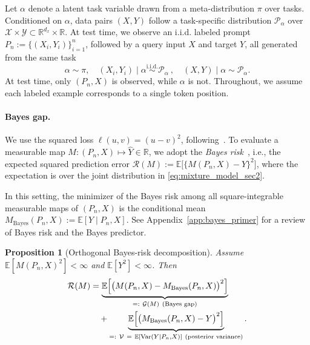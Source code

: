 \documentclass{article}
\theoremstyle{plain}
\newtheorem{proposition}[theorem]{Proposition}
\theoremstyle{definition}
\theoremstyle{remark}
\begin{document}
Let $\alpha$ denote a latent task variable drawn from a meta-distribution $\pi$ over tasks. Conditioned on $\alpha$, data pairs $(X,Y)$ follow a task-specific distribution $\mathcal{P}_\alpha$ over $\mathcal{X}\times\mathcal{Y} \subset \mathbb{R}^{d_x}\times \mathbb{R}$. At test time, we observe an i.i.d. labeled prompt $P_n := \{(X_i,Y_i)\}_{i=1}^n$, followed by a query input $X$ and target $Y$, all generated from the same task
\begin{equation}
\alpha \sim \pi,\quad
(X_i,Y_i)\mid \alpha \stackrel{\mathrm{i.i.d.}}{\sim} \mathcal{P}_\alpha \ ,\quad
(X,Y)\mid \alpha \sim \mathcal{P}_\alpha.   \label{eq:mixture_model_sec2}
\end{equation}
At test time, only $(P_n,X)$ is observed, while $\alpha$ is not. Throughout, we assume each labeled example corresponds to a single token position.


\paragraph{Bayes gap.}

We use the squared loss $\ell(u,v)=(u-v)^2$, following~\citet{gozeten2025testtime,kuwataka2025test}. To evaluate a measurable map $M: (P_n,X) \mapsto\widehat{Y}\in\mathbb{R}$, we adopt the \emph{Bayes risk}~\citep[see][\S 5.3.1.2]{Murphy2022intro}, i.e., the expected squared prediction error $\mathcal{R}(M):=\mathbb{E}\bigl[\bigl\{M(P_n,X)-Y\bigr\}^2\bigr]$, where the expectation is over the joint distribution in \eqref{eq:mixture_model_sec2}. %

In this setting, the minimizer of the Bayes risk among all square-integrable measurable maps of $(P_n,X)$ is the conditional mean $M_{\mathrm{Bayes}}(P_n,X):=\mathbb{E}[Y\mid P_n,X]$. See Appendix~\ref{app:bayes_primer} for a review of Bayes risk and the Bayes predictor.

\begin{proposition}[Orthogonal Bayes-risk decomposition]
\label{prop:bayes_decomp_sec2}
Assume $\mathbb{E}[M(P_n,X)^2]<\infty$ and $\mathbb{E}[Y^2]<\infty$. Then
\begin{align}\vspace{-2mm}
\mathcal{R}(M)
&=
\underbrace{\mathbb{E}\Bigl[\bigl(M(P_n,X)-M_{\mathrm{Bayes}}(P_n,X)\bigr)^2\Bigr]}_{=:\ \mathcal{G}(M)\ \textnormal{(Bayes gap)}} \nonumber\\
&\quad+\underbrace{\mathbb{E}\Bigl[\bigl(M_{\mathrm{Bayes}}(P_n,X)-Y\bigr)^2\Bigr]}_{=:\ \mathcal{V}\ =\ \mathbb{E}[\mathrm{Var}(Y\mid P_n,X)]\ \textnormal{(posterior variance)}}.
\label{eq:bayes_decomp_sec2}
\end{align}\vspace{-2mm}
\end{proposition}\vspace{-3mm}
\end{document}
